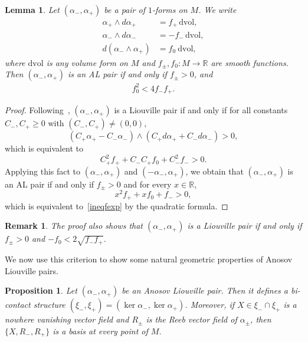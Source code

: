 \documentclass[letterpaper, 11pt]{article}
\numberwithin{equation}{section}
\newtheorem{lem}[thm]{Lemma}
\newtheorem{prop}[thm]{Proposition}
\newtheorem{rem}[thm]{Remark}
\newcommand{\R}{\mathbb{R}}
\begin{document}
\begin{lem} \label{lem:charanosov}
Let $(\alpha_-, \alpha_+)$ be a pair of $1$-forms on $M$. We  write
\begin{align*}
\alpha_+\wedge d \alpha_+ &= f_+ \, \mathrm{dvol}, \\
\alpha_- \wedge d \alpha_- &= - f_- \, \mathrm{dvol}, \\
d(\alpha_- \wedge \alpha_+) &= f_0 \ \mathrm{dvol},
\end{align*}
where $\mathrm{dvol}$ is any volume form on $M$ and $f_\pm, f_0 : M \rightarrow \R$ are smooth functions. Then $(\alpha_-, \alpha_+)$ is an AL pair if and only if $f_\pm > 0$, and
\begin{align} \label{ineqfexp}
f_0^2 < 4 f_- f_+.
\end{align}
\end{lem}

\begin{proof}
Following~\cite[Lemma 9.4]{MNW}, $(\alpha_-, \alpha_+)$ is a Liouville pair if and only if for all constants $C_-, C_+ \geq 0$ with $(C_-,C_+) \neq (0,0)$, $$(C_+ \alpha_+ - C_- \alpha_-)\wedge (C_+ d\alpha_+ + C_- d\alpha_-) > 0,$$
which is equivalent to $$C_+^2 f_+ + C_- C_+ f_0 + C_-^2 f_- > 0.$$ Applying this fact to $(\alpha_-, \alpha_+)$ and $(- \alpha_-, \alpha_+)$, we obtain that $(\alpha_-, \alpha_+)$ is an AL pair if and only if $f_\pm > 0$ and for every $x \in \R$, $$x^2 f_+ + x f_0 + f_- > 0,$$ which is equivalent to~\eqref{ineqfexp} by the quadratic formula.
\end{proof}

\begin{rem} \label{rem:liouv}
The proof also shows that $(\alpha_-, \alpha_+)$ is a Liouville pair if and only if $f_\pm > 0$ and $- f_0 < 2 \sqrt{f_- f_+}$.
\end{rem}

We now use this criterion to show some natural  geometric properties of Anosov Liouville pairs.

\begin{prop} \label{prop:anoliouv}
Let $(\alpha_-, \alpha_+)$ be an Anosov Liouville pair. Then it defines a bi-contact structure $(\xi_-,\xi_+) = (\ker \alpha_-, \ker \alpha_+)$. Moreover, if $X \in \xi_- \cap \xi_+$ is a nowhere vanishing vector field and $R_\pm$ is the Reeb vector field of $\alpha_\pm$, then $\{X, R_-, R_+\}$ is a basis at every point of $M$.
\end{prop}
\end{document}
